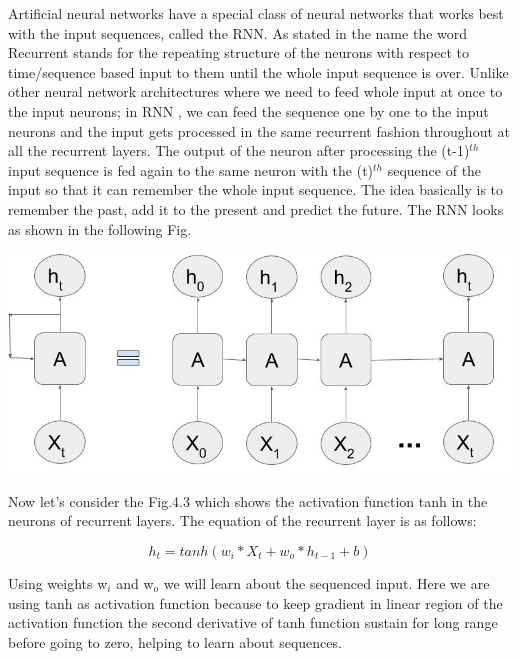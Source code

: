 Artificial neural networks have a special class of neural networks that works best with the input sequences, called the RNN. As stated in the name the word Recurrent stands for the repeating structure of the neurons with respect to time/sequence based input to them until the whole input sequence is over. Unlike other neural network architectures where we need to feed whole input at once to the input neurons; in RNN \cite{13}, we can feed the sequence one by one to the input neurons and the input gets processed in the same recurrent fashion throughout at all the recurrent layers. The output of the neuron after processing the (t-1)$^{th}$ input sequence is fed again to the same neuron with the (t)$^{th}$ sequence of the input so that it can remember the whole input sequence. The idea basically is to remember the past, add it to the present and predict the future. The RNN looks as shown in the following Fig.

				\begin{center}
				\includegraphics[width=\linewidth]{figures/An-unrolled-recurrent-neural-network.jpg}	
				\label{fig: Unfolded Recurrent layer}
				\end{center}


Now let’s consider the Fig.4.3 which shows the activation function tanh in the neurons of recurrent layers. The equation of the recurrent layer is as follows:

\begin{equation}
	h_{t} = tanh (w_{i} * X_{t} + w_{o} * h_{t-1} + b)
\end{equation}

Using weights w$_{i}$ and w$_{o}$ we will learn about the sequenced input. Here we are using tanh as activation function because to keep gradient in linear region of the activation function the second derivative of tanh function sustain for long range before going to zero, helping to learn about sequences.


